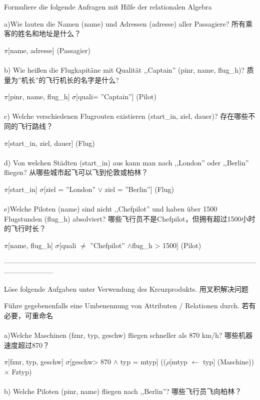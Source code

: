 \documentclass[fleqn]{article}
\begin{document}
\noindent Formuliere die folgende Anfragen mit Hilfe der relationalen Algebra

\noindent a)Wie lauten die Namen (name) und Adressen (adresse) aller Passagiere? 所有乘客的姓名和地址是什么？

$\pi$[name, adresse] (Passagier)
\\
\\
\noindent b) Wie heißen die Flugkapitäne mit Qualität ,,Captain'' (pinr, name, flug\_h)? 质量为''机长”的飞行机长的名字是什么?

$\pi$[pinr, name, flug\_h] $\sigma$[quali= ''Captain''] (Pilot)
\\
\\
\noindent c) Welche verschiedenen Flugrouten existieren (start\_in, ziel, dauer)? 存在哪些不同的飞行路线？

$\pi$[start\_in, ziel, dauer] (Flug)
\\
\\
\noindent d) Von welchen Städten (start\_in) aus kann man nach ,,London'' oder ,,Berlin'' fliegen? 从哪些城市起飞可以飞到伦敦或柏林？

$\pi$[start\_in] $\sigma$[ziel = ''London'' $\vee$ ziel = ''Berlin''] (Flug)
\\
\\
\noindent e)Welche Piloten (name) sind nicht ,,Chefpilot'' und haben über 1500  Flugstunden (flug\_h) absolviert? 哪些飞行员不是Chefpilot，但拥有超过1500小时的飞行时长？

$\pi$[name, flug\_h] $\sigma$[quali $\neq$ ''Chefpilot'' $\wedge$flug\_h > 1500] (Pilot)

\noindent---------------------------------------------------------------------------------------------------------------------------------

\noindent Löse folgende Aufgaben unter Verwendung des Kreuzprodukts. 用叉积解决问题

\noindent Führe gegebenenfalls eine Umbenennung von Attributen / Relationen durch. 若有必要，可重命名
\\
\\
\noindent a)Welche Maschinen (fznr, typ, geschw) fliegen schneller als 870 km/h? 哪些机器速度超过870？

$\pi$[fznr, typ, geschw] $\sigma$[geschw> 870 $\wedge$ typ = mtyp] (($\rho$[mtyp $\leftarrow$ typ] (Maschine)) $\times$ Fztyp)
\\
\\
\noindent b) Welche Piloten (pinr, name) fliegen nach ,,Berlin''? 哪些飞行员飞向柏林？
\end{document}
